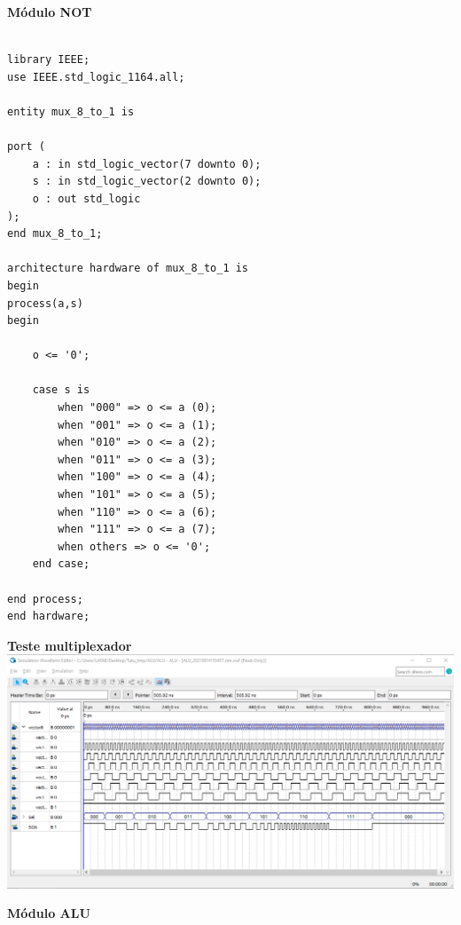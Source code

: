 \documentclass{article}
\begin{document}
\textbf{Módulo NOT}

\begin{verbatim}

library IEEE;
use IEEE.std_logic_1164.all;

entity mux_8_to_1 is

port (
	a : in std_logic_vector(7 downto 0);
	s : in std_logic_vector(2 downto 0);
	o : out std_logic
);
end mux_8_to_1;

architecture hardware of mux_8_to_1 is
begin
process(a,s)
begin

	o <= '0';
	
	case s is
		when "000" => o <= a (0);
		when "001" => o <= a (1);
		when "010" => o <= a (2);
		when "011" => o <= a (3);
		when "100" => o <= a (4);
		when "101" => o <= a (5);
		when "110" => o <= a (6);
		when "111" => o <= a (7);
		when others => o <= '0';
	end case;

end process;
end hardware;

\end{verbatim}

\begin{center}
\textbf{Teste multiplexador}
\includegraphics[width=\textwidth]{img/teste_mux.png}
\end{center}



\textbf{Módulo ALU}
\end{document}
